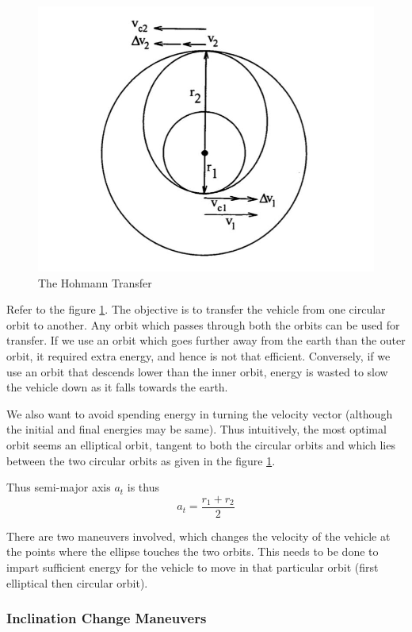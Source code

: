 \documentclass{article}
\theoremstyle{definition}
\begin{document}
\begin{figure}[h]
    \centering
    \includegraphics[scale=0.2]{image 5.jpeg}
    \caption{The Hohmann Transfer}
    \label{fig:HT}
\end{figure}


Refer to the figure \ref{fig:HT}. The objective is to transfer the vehicle from one circular orbit to another. 
Any orbit which passes through both the orbits can be used for transfer. 
If we use an orbit which goes further away from the earth than the outer orbit, it required extra energy, and hence is not that efficient. Conversely, if we use an orbit that descends lower than the inner orbit, energy is wasted to slow the vehicle down as it falls towards the earth.
\medskip

We also want to avoid spending energy in turning the velocity vector (although the initial and final energies may be same).
Thus intuitively, the most optimal orbit seems an elliptical orbit, tangent to both the circular orbits and which lies between the two circular orbits as given in the figure \ref{fig:HT}. 

Thus semi-major axis $a_t$ is thus
\[a_t = \frac{r_1 + r_2}{2}\]

There are two maneuvers involved, which changes the velocity of the vehicle at the points where the ellipse touches the two orbits. 
This needs to be done to impart sufficient energy for the vehicle to move in that particular orbit (first elliptical then circular orbit).

\subsubsection{Inclination Change Maneuvers}
\end{document}
